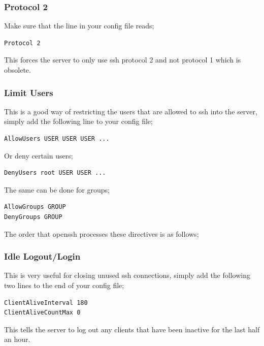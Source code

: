 \subsubsection{Protocol 2}

Make sure that the line in your config file reads;

\begin{verbatim}
Protocol 2
\end{verbatim}

This forces the server to only use ssh protocol 2 and not protocol 1 which is obsolete.

\subsubsection{Limit Users}

This is a good way of restricting the users that are allowed to ssh into the server, simply add the following line to your config file;

\begin{verbatim}
AllowUsers USER USER USER ...
\end{verbatim}

Or deny certain users;

\begin{verbatim}
DenyUsers root USER USER ...
\end{verbatim}

The same can be done for groups;

\begin{verbatim}
AllowGroups GROUP
DenyGroups GROUP
\end{verbatim}

The order that openssh processes these directives is as follows;


\subsubsection{Idle Logout/Login}

This is very useful for closing unused ssh connections, simply add the following two lines to the end of your config file;\

\begin{verbatim}
ClientAliveInterval 180
ClientAliveCountMax 0
\end{verbatim}

This tells the server to log out any clients that have been inactive for the last half an hour.

